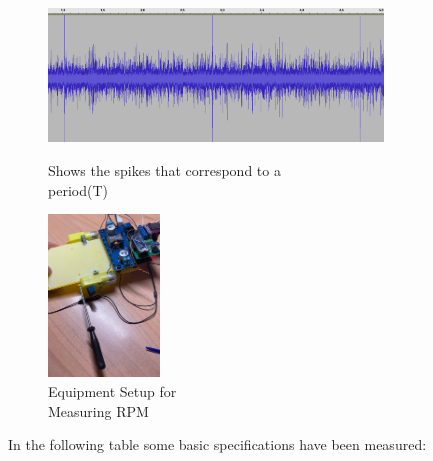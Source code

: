 \documentclass[a4paper]{article}
\begin{document}
\begin{figure}[H]
    \centering
    \begin{minipage}{.55\textwidth}
        \centering
        \includegraphics[height=1.4in]{./media/image2.png}
        \caption{Shows the spikes that correspond to a \\period(T)}
        \label{Shows the spikes that correspond to a period(T)}
    \end{minipage}\hfill
    \begin{minipage}{.35\textwidth}
        \centering
        \includegraphics[height=1.7in]{./media/image1.jpeg}
		\caption{Equipment Setup for \\ Measuring RPM}
		\label{figDuring_the_process_of_recording}
    \end{minipage}
\end{figure}












In the following table some basic specifications have been measured:


\end{document}
